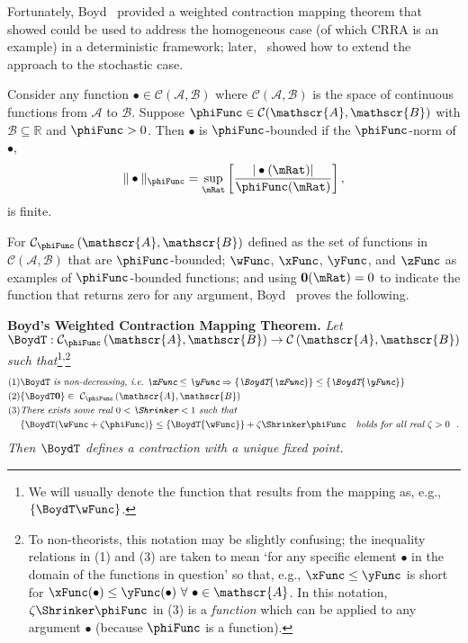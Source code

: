 \documentclass[BufferStockTheory]{subfiles}
\begin{document}
Fortunately, Boyd~\citeyearpar{jboydWeighted} provided a weighted contraction mapping theorem that~\cite{asHomogeneous} showed could be used to address the homogeneous case (of which CRRA is an example) in a deterministic framework; later,~\cite{duranDiscounting} showed how to extend the~\cite{jboydWeighted} approach to the stochastic case.
\begin{defn}
  Consider any function $\bullet\in \mathcal{C}(\mathscr{A},\mathscr{B})$ where $\mathcal{C}(\mathscr{A},\mathscr{B})$ is the space of continuous functions from $\mathscr{A}$ to $%
  \mathscr{B}$. Suppose $\phiFunc \in \mathcal{C}(\mathscr{A},\mathscr{B})$ with $%
  \mathscr{B}\subseteq\mathbb{R}$ and $\phiFunc >0$. Then $\bullet$ is $\phiFunc$-bounded if the $\phiFunc$-norm of $\bullet$,
  \begin{equation}
    \Vert \bullet\Vert _{\phiFunc }=\sup_{\mRat}\left[ \frac{|\bullet(\mRat)|}{\phiFunc (\mRat)}\right] ,
    \label{eq:phinorm}
  \end{equation}%
  is finite.
\end{defn}

For $\mathcal{C}_{\phiFunc }\left( \mathscr{A},\mathscr{B}\right) $ defined as the set of functions in $\mathcal{C}(\mathscr{A},\mathscr{B})$ that are $\phiFunc$-bounded; $\wFunc$, $\xFunc$, $\yFunc$, and $\zFunc$ as examples of $\phiFunc$-bounded functions; and using {$\mathbf{0}(\mRat)=0$} to indicate the function that returns zero for any argument, Boyd~\citeyearpar{jboydWeighted} proves the following.

\textbf{Boyd's Weighted Contraction Mapping Theorem.} \textit{Let $\BoydT:\mathcal{C}_{\phiFunc }\left( \mathscr{A},\mathscr{B}\right)
  \rightarrow \mathcal{C}\left( \mathscr{A},\mathscr{B}\right) $ such
  that}\footnote{We will usually denote the function that results from the mapping as, e.g., $\{\BoydT\wFunc\}$.}\textsuperscript{,}\footnote{To non-theorists, this notation may be slightly confusing; the inequality relations in (1) and (3) are taken to mean `for any specific element $\bullet$ in the domain of the functions in question' so that, e.g., $\xFunc \leq \yFunc$ is short for $\xFunc(\bullet) \leq \yFunc(\bullet)~\forall~\bullet\in \mathscr{A}$.  In this notation, $\zeta \Shrinker \phiFunc$ in (3) is a \textit{function} which can be applied to any argument $\bullet$ (because $\phiFunc$ is a function).} \nopagebreak
\begin{align*}
  \mbox{(1)} &\BoydT%
               \mbox{ \textit{is non-decreasing, i.e.\ ${\xFunc} \leq {\yFunc}\Rightarrow
               \{\BoydT{\xFunc}\} \leq \{\BoydT{\yFunc}\}$}}   \nonumber \\
  \mbox{(2)} & \{\BoydT\mathbf{0}\}\in ~ \mathcal{C}_{\phiFunc }\left(\mathscr{A},\mathscr{B}\right)  \notag \\
  \mbox{(3)}
             & \mbox{\textit{There exists some real $0 < \Shrinker < 1$ such that}} \\
             & \{\BoydT({\wFunc} +\zeta\phiFunc )\} \leq \{\BoydT{\wFunc}\} +\zeta\Shrinker \phiFunc
               \mbox{ \textit{~~holds for all real $\zeta > 0$ } } .
\end{align*}
\textit{Then $\BoydT$ defines a contraction with a unique fixed point.}
\end{document}
